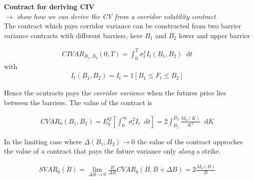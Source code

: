 \documentclass{article}
\newcommand*\diff{\mathop{}\!\mathrm{d}}
\begin{document}
\textbf{Contract for deriving CIV}\\
\textit{$\rightarrow$ show how we can derive the CV from a corridor volatility contract}\\

The contract which pays corridor variance can be constructed from two barrier variance contracts with different barriers, here $B_{1}$ and $B_{2}$ lower and upper barrier

\begin{align*}
CIV AR_{B_{1}, B_{2}}(0,T) = \int_{0}^{T} \sigma_{t}^{1}I_{t}(B_{1}, B_{2}) \diff t
\end{align*}
with 
\begin{align*}
I_{t}(B_{1}, B_{2}) = I_{t} = 1[B_{1} \leq F_{t} \leq B_{2}]
\end{align*}

Hence the ocntracts pays the \textit{corridor variance} when the futures price lies between the barriers. The value of the contract is

\begin{align*}
CV AR_{0}(B_{1}, B_{2}) = E_{0}^{Q} \left[ \int_{0}^{\infty} \sigma_{t}^{2} I_{t} \diff t \right] = 2 \int_{B_{1}}^{B_{2}} \frac{M_{0}(K)}{K^{2}} \diff K
\end{align*}

In the limiting case where $\Delta (B_{1}, B_{2}) \rightarrow 0$ the value of the contract approches the value of a contract that pays the future variance only \textit{along} a strike. 

\begin{align*}
SV AR_{0}(B) = \lim_{\Delta B \rightarrow 0} \frac{B}{\Delta B} CV AR_{0}(B, B + \Delta B) = 2 \frac{M_{0}(B)}{B}
\end{align*}
\end{document}
